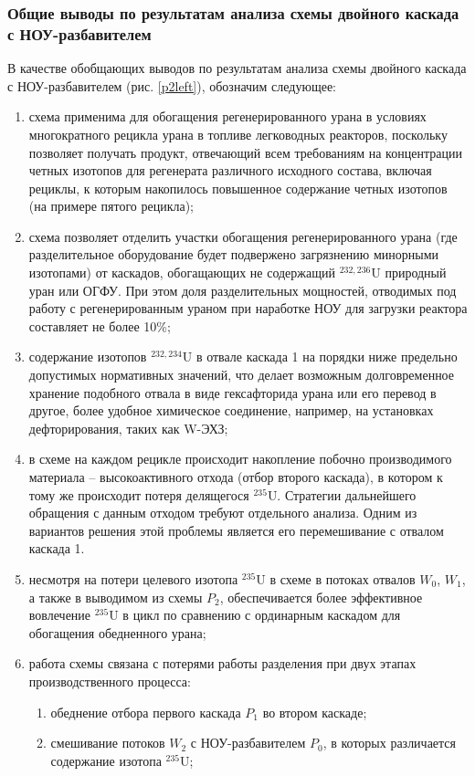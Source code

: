 \subsubsection{Общие выводы по результатам анализа схемы двойного каскада с НОУ-разбавителем}

В качестве обобщающих выводов по результатам анализа схемы двойного каскада с НОУ-разбавителем (рис. \ref{p2left}), обозначим следующее:
\begin{enumerate}
    \item схема применима для обогащения регенерированного урана в условиях многократного рецикла урана в топливе легководных реакторов, поскольку позволяет получать продукт, отвечающий всем требованиям на концентрации четных изотопов для регенерата различного исходного состава, включая рециклы, к которым накопилось повышенное содержание четных изотопов (на примере пятого рецикла);
    \item схема позволяет отделить участки обогащения регенерированного урана (где разделительное оборудование будет подвержено загрязнению минорными изотопами) от каскадов, обогащающих не содержащий $^{232,236}$U природный уран или ОГФУ. При этом доля разделительных мощностей, отводимых под работу с регенерированным ураном при наработке НОУ для загрузки реактора составляет не более 10\%;
    \item содержание изотопов $^{232,234}$U в отвале каскада 1 на порядки ниже предельно допустимых нормативных значений, что делает возможным долговременное хранение подобного отвала в виде гексафторида урана или его перевод в другое, более удобное химическое соединение, например, на установках дефторирования, таких как W-ЭХЗ;
    \item в схеме на каждом рецикле происходит накопление побочно производимого материала -- высокоактивного отхода (отбор второго каскада), в котором к тому же происходит потеря делящегося $^{235}$U. Стратегии дальнейшего обращения с данным отходом требуют отдельного анализа. Одним из вариантов решения этой проблемы является его перемешивание с отвалом каскада 1.
    \item несмотря на потери целевого изотопа $^{235}$U в схеме в потоках отвалов $W_0$, $W_1$, а также в выводимом из схемы $P_2$, обеспечивается более эффективное вовлечение $^{235}$U в цикл по сравнению с ординарным каскадом для обогащения обедненного урана;
    \item работа схемы связана с потерями работы разделения при двух этапах производственного процесса:
    \begin{enumerate}
        \item обеднение отбора первого каскада $P_1$ во втором каскаде;
        \item смешивание потоков $W_2$ с НОУ-разбавителем $P_0$, в которых различается содержание изотопа $^{235}$U;
    \end{enumerate}
\end{enumerate}

